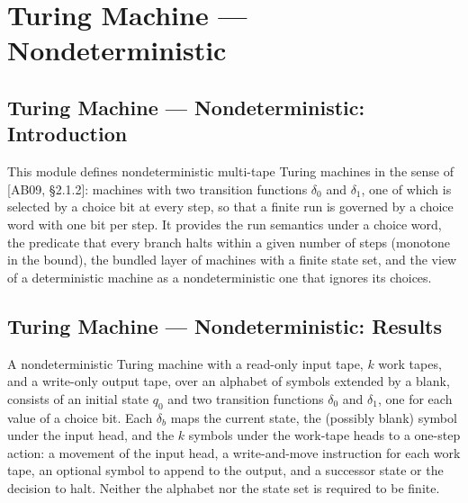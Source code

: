 \section{Turing Machine --- Nondeterministic}
\subsection*{Turing Machine --- Nondeterministic: Introduction}

This module defines nondeterministic multi-tape Turing machines in the sense of
[AB09, \S 2.1.2]: machines with two transition functions $\delta_0$ and $\delta_1$, one
of which is selected by a choice bit at every step, so that a finite run is governed by a
choice word with one bit per step.  It provides the run semantics under a choice word, the
predicate that every branch halts within a given number of steps (monotone in the bound),
the bundled layer of machines with a finite state set, and the view of a deterministic
machine as a nondeterministic one that ignores its choices.

\subsection*{Turing Machine --- Nondeterministic: Results}

\begin{definition}
\label{Turing.NDTM}
\leanok
{}
A nondeterministic Turing machine with a read-only input tape, $k$ work tapes, and a
write-only output tape, over an alphabet of symbols extended by a blank, consists of an
initial state $q_0$ and two transition functions $\delta_0$ and $\delta_1$, one for each
value of a choice bit.  Each $\delta_b$ maps the current state, the (possibly blank) symbol
under the input head, and the $k$ symbols under the work-tape heads to a one-step action:
a movement of the input head, a write-and-move instruction for each work tape, an optional
symbol to append to the output, and a successor state or the decision to halt.  Neither the
alphabet nor the state set is required to be finite.
\end{definition}

